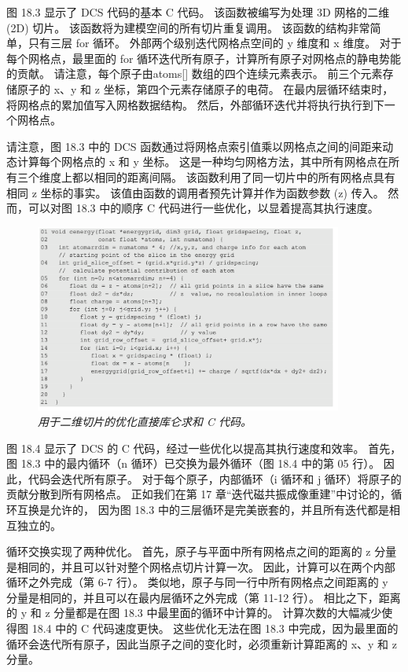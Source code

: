 图 18.3 显示了 DCS 代码的基本 C 代码。 该函数被编写为处理 3D 网格的二维 (2D) 切片。 
该函数将为建模空间的所有切片重复调用。 该函数的结构非常简单，只有三层 for 循环。 
外部两个级别迭代网格点空间的 y 维度和 x 维度。 
对于每个网格点，最里面的 for 循环迭代所有原子，计算所有原子对网格点的静电势能的贡献。 
请注意，每个原子由atoms[] 数组的四个连续元素表示。 前三个元素存储原子的 x、y 和 z 坐标，第四个元素存储原子的电荷。 
在最内层循环结束时，将网格点的累加值写入网格数据结构。 然后，外部循环迭代并将执行执行到下一个网格点。

请注意，图 18.3 中的 DCS 函数通过将网格点索引值乘以网格点之间的间距来动态计算每个网格点的 x 和 y 坐标。 
这是一种均匀网格方法，其中所有网格点在所有三个维度上都以相同的距离间隔。 
该函数利用了同一切片中的所有网格点具有相同 z 坐标的事实。 该值由函数的调用者预先计算并作为函数参数 (z) 传入。 
然而，可以对图 18.3 中的顺序 C 代码进行一些优化，以显着提高其执行速度。

\begin{figure}[H]
	\centering
	\includegraphics[width=0.9\textwidth]{figs/F18.4.png}
	\caption{\textit{用于二维切片的优化直接库仑求和 C 代码。}}
\end{figure}

图 18.4 显示了 DCS 的 C 代码，经过一些优化以提高其执行速度和效率。 
首先，图 18.3 中的最内循环（n 循环）已交换为最外循环（图 18.4 中的第 05 行）。 因此，代码会迭代所有原子。 
对于每个原子，内部循环（i 循环和 j 循环）将原子的贡献分散到所有网格点。 
正如我们在第 17 章“迭代磁共振成像重建”中讨论的，循环互换是允许的，
因为图 18.3 中的三层循环是完美嵌套的，并且所有迭代都是相互独立的。

循环交换实现了两种优化。 首先，原子与平面中所有网格点之间的距离的 z 分量是相同的，并且可以针对整个网格点切片计算一次。 
因此，计算可以在两个内部循环之外完成（第 6-7 行）。 
类似地，原子与同一行中所有网格点之间距离的 y 分量是相同的，并且可以在最内层循环之外完成（第 11-12 行）。 
相比之下，距离的 y 和 z 分量都是在图 18.3 中最里面的循环中计算的。 计算次数的大幅减少使得图 18.4 中的 C 代码速度更快。 
这些优化无法在图 18.3 中完成，因为最里面的循环会迭代所有原子，因此当原子之间的变化时，必须重新计算距离的 x、y 和 z 分量。

